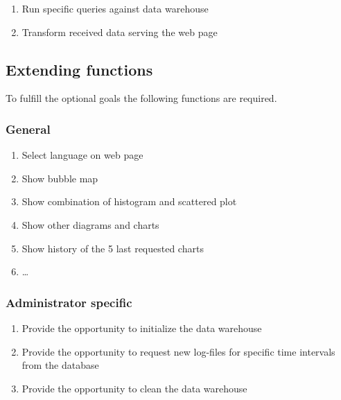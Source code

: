 \begin{enumerate}[resume]
  
  \item Run specific queries against data warehouse
  
  \item Transform received data serving the web page

\end{enumerate}


\subsection{Extending functions}

To fulfill the optional goals the following functions are required.

\subsubsection*{General}
\begin{enumerate}[resume]
  
  \item Select language on web page
  
  \item Show bubble map %
  
  \item Show combination of histogram and scattered plot
  
  \item Show other diagrams and charts
  
  \item Show history of the 5 last requested charts
  
  \item \ldots
 
\end{enumerate}


\subsubsection*{Administrator specific}

\begin{enumerate}[resume]
   
  \item Provide the opportunity to initialize the data warehouse
   
  \item Provide the opportunity to request new log-files for specific time intervals
  	from the database
  
  \item Provide the opportunity to clean the data warehouse
   
\end{enumerate}


